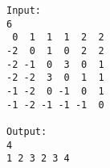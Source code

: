 \begin{verbatim}
Input:
6
 0  1  1  1  2  2
-2  0  1  0  2  2
-2 -1  0  3  0  1
-2 -2  3  0  1  1
-1 -2  0 -1  0  1
-1 -2 -1 -1 -1  0

Output:
4
1 2 3 2 3 4 
\end{verbatim}